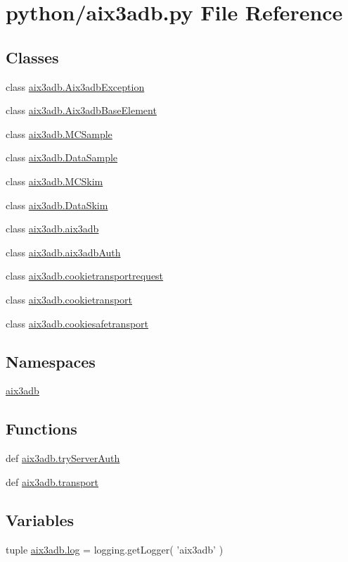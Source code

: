 \section{python/aix3adb.py File Reference}
\label{aix3adb_8py}
\subsection*{Classes}
\begin{DoxyCompactItemize}
\item 
class \hyperlink{classaix3adb_1_1Aix3adbException}{aix3adb.\-Aix3adb\-Exception}
\item 
class \hyperlink{classaix3adb_1_1Aix3adbBaseElement}{aix3adb.\-Aix3adb\-Base\-Element}
\item 
class \hyperlink{classaix3adb_1_1MCSample}{aix3adb.\-M\-C\-Sample}
\item 
class \hyperlink{classaix3adb_1_1DataSample}{aix3adb.\-Data\-Sample}
\item 
class \hyperlink{classaix3adb_1_1MCSkim}{aix3adb.\-M\-C\-Skim}
\item 
class \hyperlink{classaix3adb_1_1DataSkim}{aix3adb.\-Data\-Skim}
\item 
class \hyperlink{classaix3adb_1_1aix3adb}{aix3adb.\-aix3adb}
\item 
class \hyperlink{classaix3adb_1_1aix3adbAuth}{aix3adb.\-aix3adb\-Auth}
\item 
class \hyperlink{classaix3adb_1_1cookietransportrequest}{aix3adb.\-cookietransportrequest}
\item 
class \hyperlink{classaix3adb_1_1cookietransport}{aix3adb.\-cookietransport}
\item 
class \hyperlink{classaix3adb_1_1cookiesafetransport}{aix3adb.\-cookiesafetransport}
\end{DoxyCompactItemize}
\subsection*{Namespaces}
\begin{DoxyCompactItemize}
\item 
\hyperlink{namespaceaix3adb}{aix3adb}
\end{DoxyCompactItemize}
\subsection*{Functions}
\begin{DoxyCompactItemize}
\item 
def \hyperlink{namespaceaix3adb_a814ec586946a29d4ad14126e56f0192f}{aix3adb.\-try\-Server\-Auth}
\item 
def \hyperlink{namespaceaix3adb_a015924822bed0204e3fea3fbd7eb0b81}{aix3adb.\-transport}
\end{DoxyCompactItemize}
\subsection*{Variables}
\begin{DoxyCompactItemize}
\item 
tuple \hyperlink{namespaceaix3adb_a0ad187df59c9927625e9fc1484ece973}{aix3adb.\-log} = logging.\-get\-Logger( 'aix3adb' )
\end{DoxyCompactItemize}
